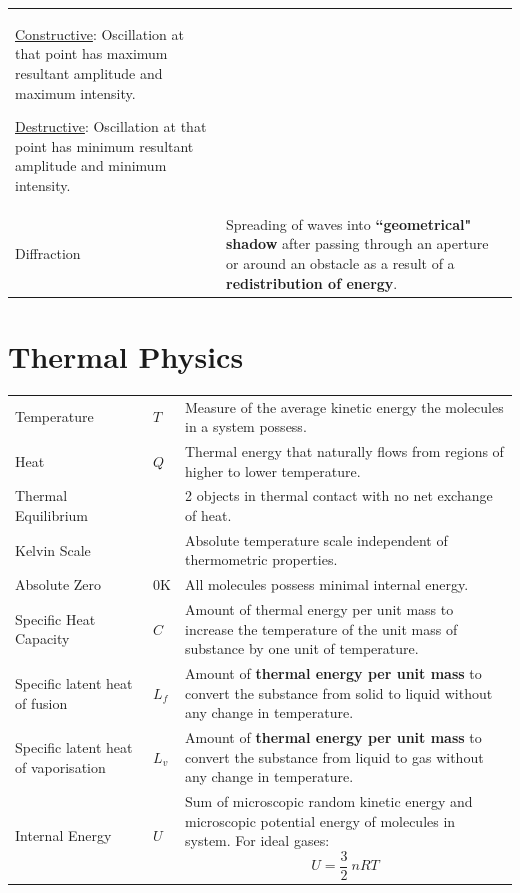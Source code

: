 \documentclass[a4paper,11pt]{article}
\begin{document}
\begin{center}
\begin{tabular}{@{} l p{10cm} @{}}
\begin{minipage}[t]{\textwidth}
			\end{minipage} \par 
			\underline{Constructive}: Oscillation at that point has maximum resultant amplitude and maximum intensity.\par
			\underline{Destructive}: Oscillation at that point has minimum resultant amplitude and minimum intensity.\\
			Diffraction & Spreading of waves into \textbf{``geometrical" shadow} after passing through an aperture or around an obstacle as a result of a \textbf{redistribution of energy}. \\
			\bottomrule
		\end{tabular}
	\end{center}
	\newpage
	\section{Thermal Physics}
		\begin{center}
			\renewcommand{\arraystretch}{1.5}
			\begin{tabular}{@{} l l p{8.5cm} @{}}
				\toprule
				Temperature & $T$ & Measure of the average kinetic energy the molecules in a system possess. \\
				Heat & $Q$ & Thermal energy that naturally flows from regions of higher to lower temperature. \\
				Thermal Equilibrium & & 2 objects in thermal contact with no net exchange of heat. \\
				Kelvin Scale & & Absolute temperature scale independent of thermometric properties. \\
				Absolute Zero & 0K & All molecules possess minimal internal energy. \\
				Specific Heat Capacity & $C$ & Amount of thermal energy per unit mass to increase the temperature of the unit mass of substance by one unit of temperature. \\
				Specific latent heat of fusion & $L_f$ & Amount of \textbf{thermal energy per unit mass} to convert the substance from solid to liquid without any change in temperature. \\
				Specific latent heat of vaporisation & $L_v$ & Amount of \textbf{thermal energy per unit mass} to convert the substance from liquid to gas without any change in temperature. \\
				Internal Energy & $U$ & Sum of microscopic random kinetic energy and microscopic potential energy of molecules in system. For ideal gases: $$U=\frac{3}{2}~nRT$$ \vspace*{-\baselineskip} \\ 
				\bottomrule
			\end{tabular}
		\end{center}
\end{document}
